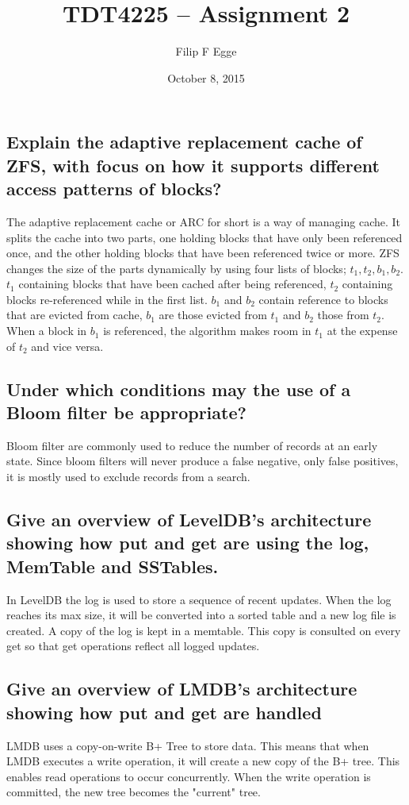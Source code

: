 \documentclass{article}
\begin{document}
 
\title{TDT4225 -- Assignment 2} 
\author{Filip F Egge}
\date{October 8, 2015} 
\maketitle

\newpage

\subsection*{Explain the adaptive replacement cache of ZFS, with focus on how
it supports different access patterns of blocks?} 
The adaptive replacement cache or ARC for short is a way of managing cache. It
splits the cache into two parts, one holding blocks that have only been
referenced once, and the other holding blocks that have been referenced twice or
more.  ZFS changes the size of the parts dynamically by using four lists of
blocks; $t_1, t_2, b_1, b_2$. $t_1$ containing blocks that have been cached
after being referenced, $t_2$ containing blocks re-referenced while in the first
list. $b_1$ and $b_2$ contain reference to blocks that are evicted from cache,
$b_1$ are those evicted from $t_1$ and $b_2$ those from $t_2$. When a block in
$b_1$ is referenced, the algorithm makes room in $t_1$ at the expense of $t_2$
and vice versa.

\subsection*{Under which conditions may the use of a Bloom filter be
appropriate?} Bloom filter are commonly used to reduce the number of records at
an early state. Since bloom filters will never produce a false negative, only
false positives, it is mostly used to exclude records from a search.

\subsection*{Give an overview of LevelDB's architecture showing how put and
get are using the log, MemTable and SSTables.} 
In LevelDB the log is used to store a sequence of recent updates. When the log
reaches its max size, it will be converted into a sorted table and a new log
file is created. A copy of the log is kept in a memtable. This copy is consulted
on every get so that get operations reflect all logged updates. 

\subsection*{Give an overview of LMDB's architecture showing how put and get
are handled}
LMDB uses a copy-on-write B+ Tree to store data. This means that when LMDB
executes a write operation, it will create a new copy of the B+ tree. This
enables read operations to occur concurrently. When the write operation is
committed, the new tree becomes the "current" tree.
\end{document}
